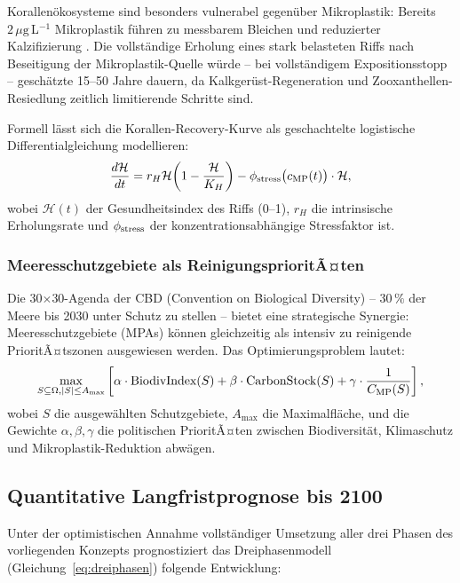 ﻿\documentclass[12pt,a4paper]{article}
\theoremstyle{definition}
\theoremstyle{remark}
\newcommand{\MP}{Mikroplastik}
\begin{document}
Korallen\"okosysteme sind besonders vulnerabel gegen\"uber \MP{}: 
Bereits $2\,\mu\text{g}$\,L$^{-1}$ \MP{} f\"uhren zu messbarem Bleichen
und reduzierter Kalzifizierung \cite{reichert2018plastic}.
Die vollst\"andige Erholung eines stark belasteten Riffs nach Beseitigung
der \MP{}-Quelle w\"urde -- bei vollst\"andigem Expositionsstopp --
gesch\"atzte 15--50 Jahre dauern, da Kalkger\"ust-Regeneration und
Zooxanthellen-Resiedlung zeitlich limitierende Schritte sind.

Formell l\"asst sich die Korallen-Recovery-Kurve als
geschachtelte logistische Differentialgleichung modellieren:
\begin{equation}
  \frac{d\mathcal{H}}{dt} = r_H \mathcal{H}\!\left(1 - \frac{\mathcal{H}}{K_H}\right)
  - \phi_{\rm stress}\bigl(c_{\rm MP}(t)\bigr) \cdot \mathcal{H},
\end{equation}
wobei $\mathcal{H}(t)$ der Gesundheitsindex des Riffs (0--1),
$r_H$ die intrinsische Erholungsrate und $\phi_{\rm stress}$ der
konzentrationsabh\"angige Stressfaktor ist.

\subsubsection{Meeresschutzgebiete als ReinigungsprioritÃ¤ten}

Die 30$\times$30-Agenda der CBD (Convention on Biological Diversity) --
$30\,\%$ der Meere bis 2030 unter Schutz zu stellen -- bietet eine
strategische Synergie: Meeresschutzgebiete (MPAs) k\"onnen gleichzeitig als
intensiv zu reinigende PrioritÃ¤tszonen ausgewiesen werden. Das
Optimierungsproblem lautet:
\begin{equation}
  \max_{S \subseteq \Omega, |S| \leq A_{\max}}
  \left[\alpha \cdot \text{BiodivIndex}(S) + \beta \cdot \text{CarbonStock}(S)
  + \gamma \cdot \frac{1}{C_{\rm MP}(S)}\right],
  \label{eq:mpa_optim}
\end{equation}
wobei $S$ die ausgew\"ahlten Schutzgebiete, $A_{\max}$ die Maximalfl\"ache,
und die Gewichte $\alpha, \beta, \gamma$ die politischen PrioritÃ¤ten
zwischen Biodiversit\"at, Klimaschutz und \MP{}-Reduktion abw\"agen.

\subsection{Quantitative Langfristprognose bis 2100}

Unter der optimistischen Annahme vollst\"andiger Umsetzung aller drei
Phasen des vorliegenden Konzepts prognostiziert das Dreiphasenmodell
(Gleichung~\eqref{eq:dreiphasen}) folgende Entwicklung:
\end{document}

